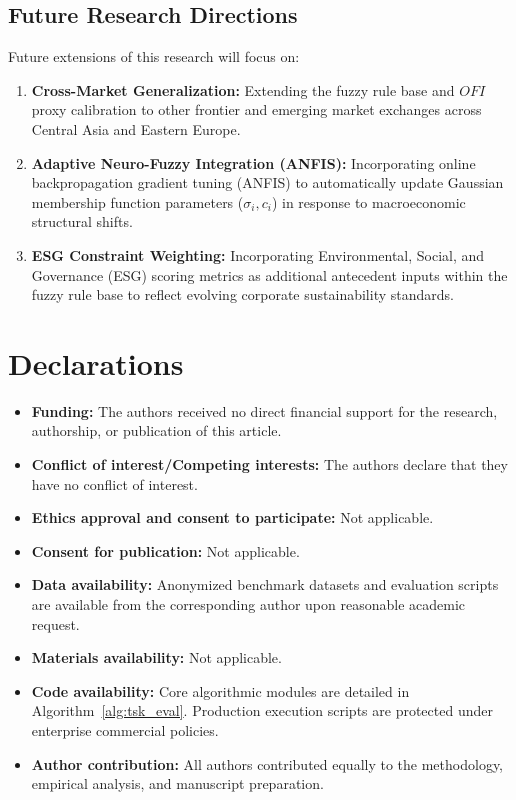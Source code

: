 \documentclass[pdflatex,sn-mathphys-num]{sn-jnl}
\theoremstyle{thmstyleone}
\theoremstyle{thmstyletwo}
\theoremstyle{thmstylethree}
\begin{document}
\subsection{Future Research Directions}

Future extensions of this research will focus on:
\begin{enumerate}
    \item \textbf{Cross-Market Generalization:} Extending the fuzzy rule base and $OFI$ proxy calibration to other frontier and emerging market exchanges across Central Asia and Eastern Europe.
    \item \textbf{Adaptive Neuro-Fuzzy Integration (ANFIS):} Incorporating online backpropagation gradient tuning (ANFIS) to automatically update Gaussian membership function parameters ($\sigma_i, c_i$) in response to macroeconomic structural shifts.
    \item \textbf{ESG Constraint Weighting:} Incorporating Environmental, Social, and Governance (ESG) scoring metrics as additional antecedent inputs within the fuzzy rule base to reflect evolving corporate sustainability standards.
\end{enumerate}

\section*{Declarations}

\begin{itemize}
\item \textbf{Funding:} The authors received no direct financial support for the research, authorship, or publication of this article.
\item \textbf{Conflict of interest/Competing interests:} The authors declare that they have no conflict of interest.
\item \textbf{Ethics approval and consent to participate:} Not applicable.
\item \textbf{Consent for publication:} Not applicable.
\item \textbf{Data availability:} Anonymized benchmark datasets and evaluation scripts are available from the corresponding author upon reasonable academic request.
\item \textbf{Materials availability:} Not applicable.
\item \textbf{Code availability:} Core algorithmic modules are detailed in Algorithm~\ref{alg:tsk_eval}. Production execution scripts are protected under enterprise commercial policies.
\item \textbf{Author contribution:} All authors contributed equally to the methodology, empirical analysis, and manuscript preparation.
\end{itemize}
\end{document}
